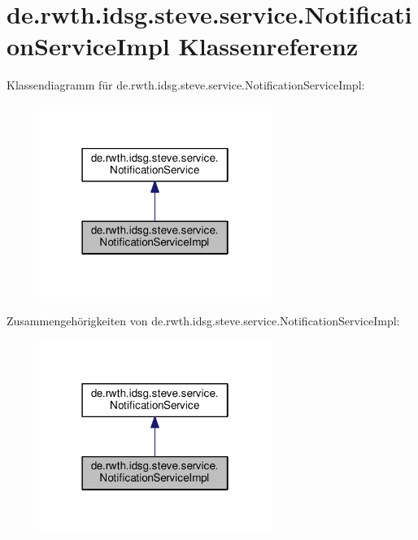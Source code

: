\hypertarget{classde_1_1rwth_1_1idsg_1_1steve_1_1service_1_1_notification_service_impl}{\section{de.\+rwth.\+idsg.\+steve.\+service.\+Notification\+Service\+Impl Klassenreferenz}
\label{classde_1_1rwth_1_1idsg_1_1steve_1_1service_1_1_notification_service_impl}
}


Klassendiagramm für de.\+rwth.\+idsg.\+steve.\+service.\+Notification\+Service\+Impl\+:\nopagebreak
\begin{figure}[H]
\begin{center}
\leavevmode
\includegraphics[width=214pt]{classde_1_1rwth_1_1idsg_1_1steve_1_1service_1_1_notification_service_impl__inherit__graph}
\end{center}
\end{figure}


Zusammengehörigkeiten von de.\+rwth.\+idsg.\+steve.\+service.\+Notification\+Service\+Impl\+:\nopagebreak
\begin{figure}[H]
\begin{center}
\leavevmode
\includegraphics[width=214pt]{classde_1_1rwth_1_1idsg_1_1steve_1_1service_1_1_notification_service_impl__coll__graph}
\end{center}
\end{figure}
